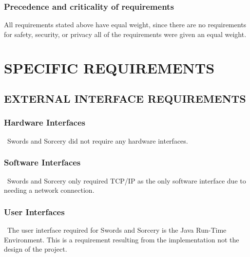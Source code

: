 \documentclass[twoside,letterpaper,pdftex]{article}
\begin{document}
\subsubsection[Precedence and criticality of requirements]{\rmfamily\bfseries\color{black}
Precedence and criticality of requirements}
\hypertarget{RefHeading20259017292}{}{\itshape\color{black}
}

{\color{black}
All requirements stated above have equal weight, since there are no requirements for safety, security, or privacy all of the requirements were given an equal weight.}

\clearpage\section[SPECIFIC REQUIREMENTS]{\rmfamily\bfseries\color{black} SPECIFIC REQUIREMENTS}
\hypertarget{RefHeading20459017292}{}{\itshape\color{black}
}

\subsection[EXTERNAL INTERFACE REQUIREMENTS]{\rmfamily\bfseries\color{black} EXTERNAL INTERFACE
REQUIREMENTS}
\hypertarget{RefHeading20659017292}{}{\itshape\color{black}
}

\subsubsection[Hardware Interfaces]{\rmfamily\bfseries\color{black} Hardware Interfaces}
\hypertarget{RefHeading20859017292}{}{\color{black}
\foreignlanguage{english}{\ Swords and Sorcery did not require any hardware interfaces.}}

\subsubsection[Software Interfaces]{\rmfamily\bfseries\color{black} Software Interfaces}
\hypertarget{RefHeading21059017292}{}{\color{black}
\foreignlanguage{english}{\ Swords and Sorcery only required TCP/IP as the only software interface due to needing a network connection.}}

\subsubsection[User Interfaces]{\rmfamily\bfseries\color{black} User Interfaces}
\hypertarget{RefHeading21259017292}{}{\color{black}
\foreignlanguage{english}{\ The user interface required for Swords and Sorcery is the Java Run-Time Environment. This is a requirement resulting from the implementation not the design of the project. }}
\end{document}
